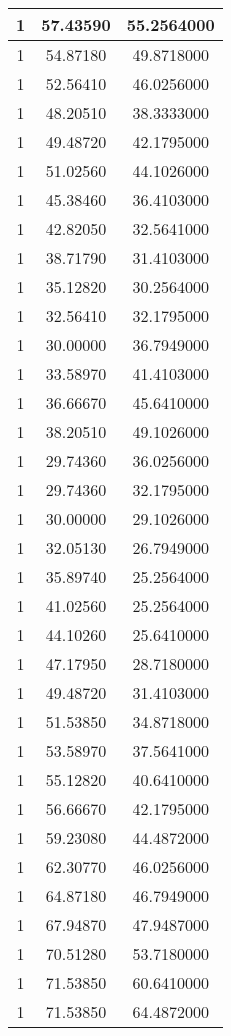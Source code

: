 \documentclass[
]{book}
\begin{document}
\begin{tabular}{c|c|c}
\hline
1 & 57.43590 & 55.2564000\\
\hline
1 & 54.87180 & 49.8718000\\
\hline
1 & 52.56410 & 46.0256000\\
\hline
1 & 48.20510 & 38.3333000\\
\hline
1 & 49.48720 & 42.1795000\\
\hline
1 & 51.02560 & 44.1026000\\
\hline
1 & 45.38460 & 36.4103000\\
\hline
1 & 42.82050 & 32.5641000\\
\hline
1 & 38.71790 & 31.4103000\\
\hline
1 & 35.12820 & 30.2564000\\
\hline
1 & 32.56410 & 32.1795000\\
\hline
1 & 30.00000 & 36.7949000\\
\hline
1 & 33.58970 & 41.4103000\\
\hline
1 & 36.66670 & 45.6410000\\
\hline
1 & 38.20510 & 49.1026000\\
\hline
1 & 29.74360 & 36.0256000\\
\hline
1 & 29.74360 & 32.1795000\\
\hline
1 & 30.00000 & 29.1026000\\
\hline
1 & 32.05130 & 26.7949000\\
\hline
1 & 35.89740 & 25.2564000\\
\hline
1 & 41.02560 & 25.2564000\\
\hline
1 & 44.10260 & 25.6410000\\
\hline
1 & 47.17950 & 28.7180000\\
\hline
1 & 49.48720 & 31.4103000\\
\hline
1 & 51.53850 & 34.8718000\\
\hline
1 & 53.58970 & 37.5641000\\
\hline
1 & 55.12820 & 40.6410000\\
\hline
1 & 56.66670 & 42.1795000\\
\hline
1 & 59.23080 & 44.4872000\\
\hline
1 & 62.30770 & 46.0256000\\
\hline
1 & 64.87180 & 46.7949000\\
\hline
1 & 67.94870 & 47.9487000\\
\hline
1 & 70.51280 & 53.7180000\\
\hline
1 & 71.53850 & 60.6410000\\
\hline
1 & 71.53850 & 64.4872000\\

\end{tabular}
\end{document}
